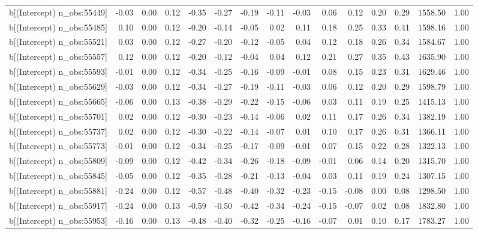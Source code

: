 \begin{table}[ht]
\begin{tabular}{rrrrrrrrrrrrrrr}
  b[(Intercept) n\_obs:55449] & -0.03 & 0.00 & 0.12 & -0.35 & -0.27 & -0.19 & -0.11 & -0.03 & 0.06 & 0.12 & 0.20 & 0.29 & 1558.50 & 1.00 \\ 
  b[(Intercept) n\_obs:55485] & 0.10 & 0.00 & 0.12 & -0.20 & -0.14 & -0.05 & 0.02 & 0.11 & 0.18 & 0.25 & 0.33 & 0.41 & 1598.16 & 1.00 \\ 
  b[(Intercept) n\_obs:55521] & 0.03 & 0.00 & 0.12 & -0.27 & -0.20 & -0.12 & -0.05 & 0.04 & 0.12 & 0.18 & 0.26 & 0.34 & 1584.67 & 1.00 \\ 
  b[(Intercept) n\_obs:55557] & 0.12 & 0.00 & 0.12 & -0.20 & -0.12 & -0.04 & 0.04 & 0.12 & 0.21 & 0.27 & 0.35 & 0.43 & 1635.90 & 1.00 \\ 
  b[(Intercept) n\_obs:55593] & -0.01 & 0.00 & 0.12 & -0.34 & -0.25 & -0.16 & -0.09 & -0.01 & 0.08 & 0.15 & 0.23 & 0.31 & 1629.46 & 1.00 \\ 
  b[(Intercept) n\_obs:55629] & -0.03 & 0.00 & 0.12 & -0.34 & -0.27 & -0.19 & -0.11 & -0.03 & 0.06 & 0.12 & 0.20 & 0.29 & 1598.79 & 1.00 \\ 
  b[(Intercept) n\_obs:55665] & -0.06 & 0.00 & 0.13 & -0.38 & -0.29 & -0.22 & -0.15 & -0.06 & 0.03 & 0.11 & 0.19 & 0.25 & 1415.13 & 1.00 \\ 
  b[(Intercept) n\_obs:55701] & 0.02 & 0.00 & 0.12 & -0.30 & -0.23 & -0.14 & -0.06 & 0.02 & 0.11 & 0.17 & 0.26 & 0.34 & 1382.19 & 1.00 \\ 
  b[(Intercept) n\_obs:55737] & 0.02 & 0.00 & 0.12 & -0.30 & -0.22 & -0.14 & -0.07 & 0.01 & 0.10 & 0.17 & 0.26 & 0.31 & 1366.11 & 1.00 \\ 
  b[(Intercept) n\_obs:55773] & -0.01 & 0.00 & 0.12 & -0.34 & -0.25 & -0.17 & -0.09 & -0.01 & 0.07 & 0.15 & 0.22 & 0.28 & 1322.13 & 1.00 \\ 
  b[(Intercept) n\_obs:55809] & -0.09 & 0.00 & 0.12 & -0.42 & -0.34 & -0.26 & -0.18 & -0.09 & -0.01 & 0.06 & 0.14 & 0.20 & 1315.70 & 1.00 \\ 
  b[(Intercept) n\_obs:55845] & -0.05 & 0.00 & 0.12 & -0.35 & -0.28 & -0.21 & -0.13 & -0.04 & 0.03 & 0.11 & 0.19 & 0.24 & 1307.15 & 1.00 \\ 
  b[(Intercept) n\_obs:55881] & -0.24 & 0.00 & 0.12 & -0.57 & -0.48 & -0.40 & -0.32 & -0.23 & -0.15 & -0.08 & 0.00 & 0.08 & 1298.50 & 1.00 \\ 
  b[(Intercept) n\_obs:55917] & -0.24 & 0.00 & 0.13 & -0.59 & -0.50 & -0.42 & -0.34 & -0.24 & -0.15 & -0.07 & 0.02 & 0.08 & 1832.80 & 1.00 \\ 
  b[(Intercept) n\_obs:55953] & -0.16 & 0.00 & 0.13 & -0.48 & -0.40 & -0.32 & -0.25 & -0.16 & -0.07 & 0.01 & 0.10 & 0.17 & 1783.27 & 1.00 \\ 

\end{tabular}
\end{table}
